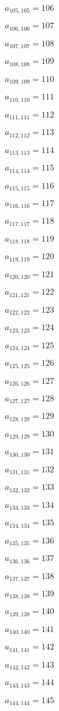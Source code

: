 \documentclass[a4paper,12pt]{article}
\begin{document}
$a _{ 105, 105 } = 106$

$a _{ 106, 106 } = 107$

$a _{ 107, 107 } = 108$

$a _{ 108, 108 } = 109$

$a _{ 109, 109 } = 110$

$a _{ 110, 110 } = 111$

$a _{ 111, 111 } = 112$

$a _{ 112, 112 } = 113$

$a _{ 113, 113 } = 114$

$a _{ 114, 114 } = 115$

$a _{ 115, 115 } = 116$

$a _{ 116, 116 } = 117$

$a _{ 117, 117 } = 118$

$a _{ 118, 118 } = 119$

$a _{ 119, 119 } = 120$

$a _{ 120, 120 } = 121$

$a _{ 121, 121 } = 122$

$a _{ 122, 122 } = 123$

$a _{ 123, 123 } = 124$

$a _{ 124, 124 } = 125$

$a _{ 125, 125 } = 126$

$a _{ 126, 126 } = 127$

$a _{ 127, 127 } = 128$

$a _{ 128, 128 } = 129$

$a _{ 129, 129 } = 130$

$a _{ 130, 130 } = 131$

$a _{ 131, 131 } = 132$

$a _{ 132, 132 } = 133$

$a _{ 133, 133 } = 134$

$a _{ 134, 134 } = 135$

$a _{ 135, 135 } = 136$

$a _{ 136, 136 } = 137$

$a _{ 137, 137 } = 138$

$a _{ 138, 138 } = 139$

$a _{ 139, 139 } = 140$

$a _{ 140, 140 } = 141$

$a _{ 141, 141 } = 142$

$a _{ 142, 142 } = 143$

$a _{ 143, 143 } = 144$

$a _{ 144, 144 } = 145$
\end{document}
